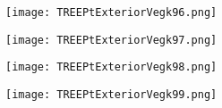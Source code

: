\documentclass[pdf]{beamer}
\begin{document}
\begin{frame}
\begin{figure}[!h]
\centering
\texttt{[image: TREEPtExteriorVegk96.png]}
\end{figure}
\end{frame}

\begin{frame}
\begin{figure}[!h]
\centering
\texttt{[image: TREEPtExteriorVegk97.png]}
\end{figure}
\end{frame}

\begin{frame}
\begin{figure}[!h]
\centering
\texttt{[image: TREEPtExteriorVegk98.png]}
\end{figure}
\end{frame}

\begin{frame}
\begin{figure}[!h]
\centering
\texttt{[image: TREEPtExteriorVegk99.png]}
\end{figure}
\end{frame}
\end{document}
